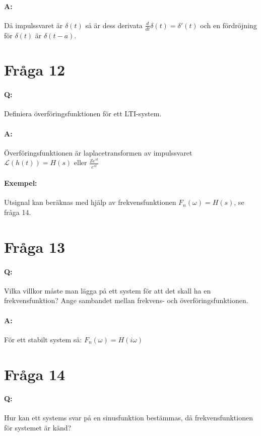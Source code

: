 \documentclass[a4paper]{article}
\begin{document}
\paragraph{A:} Då impulssvaret är $\delta(t)$ så är dess derivata $\frac{d}{dt}\delta(t)=\delta'(t)$ och en fördröjning för $\delta(t)$ är $\delta(t-a)$. 

\section{Fråga 12}
\paragraph{Q:} Definiera överföringsfunktionen för ett LTI-system.
\paragraph{A:} Överföringsfunktionen är laplacetransformen av impulssvaret\\$\mathcal{L}(h(t)) = H(s)$ eller $\frac{\mathcal{S}e^{st}}{e^{st}}$
\paragraph{Exempel:} Utsignal kan beräknas med hjälp av frekvensfunktionen $F_n(\omega)=H(s)$, se fråga 14.

\section{Fråga 13}
\paragraph{Q:} Vilka villkor måste man lägga på ett system för att det skall ha en frekvensfunktion? Ange sambandet mellan frekvens- och överföringsfunktionen.
\paragraph{A:} För ett stabilt system så: $F_n(\omega) = H(i\omega)$
\newpage

\section{Fråga 14}
\paragraph{Q:} Hur kan ett systems svar på en sinusfunktion bestämmas, då frekvensfunktionen för systemet är känd?
\end{document}
